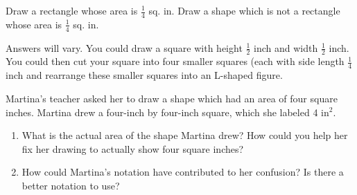 \documentclass{ximera}
\begin{document}
\begin{problem}
Draw a rectangle whose area is $\frac{1}{4}$ sq. in.  Draw a shape which is not a rectangle whose area is $\frac{1}{4}$ sq. in.

\begin{solution}
    Answers will vary.  You could draw a square with height $\frac12$ inch and width $\frac12$ inch.  You could then cut your square into four smaller squares (each with side length $\frac14$ inch and rearrange these smaller squares into an L-shaped figure.
\end{solution}
\end{problem}

\begin{problem}
Martina's teacher asked her to draw a shape which had an area of four square inches.  Martina drew a four-inch by four-inch square, which she labeled 4 in$^2$.

\begin{enumerate}
\item What is the actual area of the shape Martina drew?  How could you help her fix her drawing to actually show four square inches?
\item How could Martina's notation have contributed to her confusion?  Is there a better notation to use?
\end{enumerate}
\end{problem}
\end{document}

